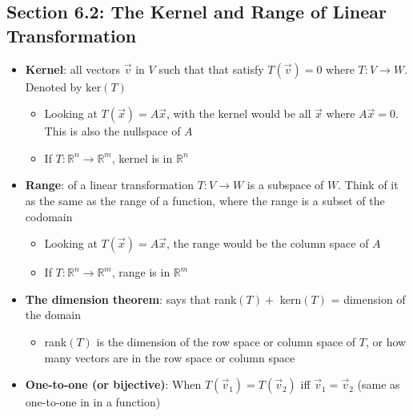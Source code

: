 \documentclass[15pt]{article}
\begin{document}
\begin{flushleft}
\section{\textbf{Section 6.2}: The Kernel and Range of Linear Transformation}
\begin{itemize}
      \item \textbf{Kernel}: all vectors $\vec{v}$ in $V$ such that that satisfy
                $T(\vec{v}) = 0$ where $T: V \to W$. Denoted by $\text{ker}(T)$
                \begin{itemize}
                        \item Looking at $T(\vec{x}) = A \vec{x}$, with the 
                                kernel would be all $\vec{x}$ where $A \vec{x} =
                                0$. This is also the nullspace of $A$
                        \item If $T: \mathbb{R}^n \to \mathbb{R}^m$, kernel is
                                in $\mathbb{R}^n$
                \end{itemize}
      \item \textbf{Range}: of a linear transformation $T: V \to W$ is a
                subspace of $W$. Think of it as the same as the range of a
                function, where the range is a subset of the codomain
                \begin{itemize}
                        \item Looking at $T(\vec{x}) = A \vec{x}$, the range
                                would be the column space of $A$
                        \item If $T: \mathbb{R}^n \to \mathbb{R}^m$, range is in
                                $\mathbb{R}^m$
                \end{itemize}
      \item \textbf{The dimension theorem}: says that rank$(T) + $ kern$(T)$ = 
                dimension of the domain
                \begin{itemize}
                        \item rank$(T)$ is the dimension of the row space or 
                                column space of $T$, or how many vectors are in 
                                the row space or column space 
                \end{itemize}
      \item \textbf{One-to-one (or bijective)}: When $T(\vec{v}_1) = 
                T(\vec{v}_2)$ iff $\vec{v}_1 = \vec{v}_2$ (same as one-to-one in
                in a function)

\end{itemize}
\end{flushleft}
\end{document}
